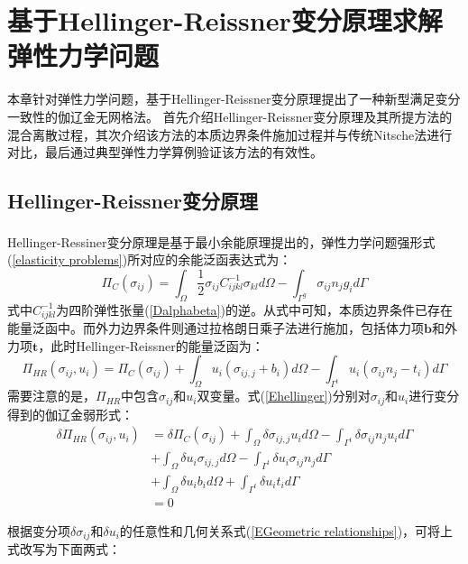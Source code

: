 \chapter{基于Hellinger-Reissner变分原理求解弹性力学问题}
本章针对弹性力学问题，基于Hellinger-Reissner变分原理提出了一种新型满足变分一致性的伽辽金无网格法。
首先介绍Hellinger-Reissner变分原理及其所提方法的混合离散过程，其次介绍该方法的本质边界条件施加过程并与传统Nitsche法进行对比，最后通过典型弹性力学算例验证该方法的有效性。
\section{Hellinger-Reissner变分原理}
Hellinger-Ressiner变分原理\textsuperscript{\cite{钱伟长1985广义变分原理}}是基于最小余能原理提出的，弹性力学问题强形式(\ref{elasticity problems})所对应的余能泛函表达式为：
\begin{equation}
\Pi_C(\sigma_{ij}) = \int_\Omega \frac{1}{2}\sigma_{ij}C_{ijkl}^{-1}\sigma_{kl} d\Omega - \int_{\Gamma^g} \sigma_{ij} n_j g_i d\Gamma
\end{equation}
式中$C_{ijkl}^{-1}$为四阶弹性张量(\ref{Dalphabeta})的逆。从式中可知，本质边界条件已存在能量泛函中。而外力边界条件则通过拉格朗日乘子法进行施加，包括体力项$\pmb b$和外力项$\pmb t$，此时Hellinger-Reissner的能量泛函为：
\begin{equation}
\label{Ehellinger}
    \Pi_{H\!R}(\sigma_{ij},u_i)=\Pi_C(\sigma_{ij})
    +\int_{\Omega}u_i(\sigma_{ij,j}+b_i)d\Omega-\int_{\Gamma^t}u_i(\sigma_{ij} n_j-t_i)d\Gamma
\end{equation}
需要注意的是，$\Pi_{HR}$中包含$\sigma_{ij}$和$u_i$双变量。式(\ref{Ehellinger})分别对$\sigma_{ij}$和$u_i$进行变分得到的伽辽金弱形式：
\begin{equation}\label{weak form1}
\begin{split} 
    \delta\Pi_{H\!R}(\sigma_{ij},u_i)&=\delta\Pi_C(\sigma_{ij})+\int_{\Omega}\delta\sigma_{ij,j}u_id\Omega-\int_{\Gamma^t}\delta\sigma_{ij}n_ju_id\Gamma\\
    &+\int_{\Omega}\delta u_i\sigma_{ij,j}d\Omega-\int_{\Gamma^t}\delta u_i\sigma_{ij}n_jd\Gamma\\
    &+\int_{\Omega}\delta u_ib_id\Omega+\int_{\Gamma^t}\delta u_it_id\Gamma\\
    &=0
\end{split}
\end{equation}\par
根据变分项$\delta \sigma_{ij}$和$\delta u_i$的任意性和几何关系式(\ref{EGeometric relationships})，可将上式改写为下面两式：
